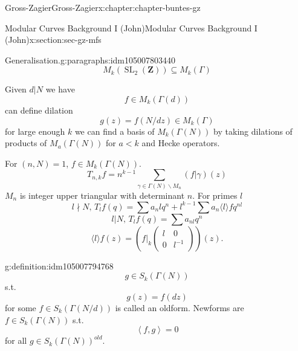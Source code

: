 \documentclass[oneside,10pt,]{book}
\numberwithin{equation}{section}
\newcommand{\inv}{^{-1}}
\newcommand{\pair}[2]{\left\langle #1, #2 \right\rangle}
\newcommand{\ZZ}{\mathbf{Z}}
\DeclareMathOperator{\SL}{SL}
\newcommand{\lt}{<}
\newcommand{\amp}{&}
\begin{document}
\begin{chapterptx}{Gross-Zagier}{}{Gross-Zagier}{}{}{x:chapter:chapter-buntes-gz}
\begin{sectionptx}{Modular Curves Background I (John)}{}{Modular Curves Background I (John)}{}{}{x:section:sec-gz-mfs}
\begin{paragraphs}{Generalisation.}{g:paragraphs:idm105007803440}
\begin{equation*}
\end{equation*}
%
\begin{equation*}
M_k(\SL_2(\ZZ)) \subseteq M_k(\Gamma )
\end{equation*}
%
\par
Given \(d|N\) we have%
\begin{equation*}
f \in M_k(\Gamma (d))
\end{equation*}
can define dilation%
\begin{equation*}
g(z) = f(N/d z) \in M_k(\Gamma )
\end{equation*}
for large enough \(k\) we can find a basis of \(M_k(\Gamma (N))\) by taking dilations of products of \(M_a(\Gamma (N))\) for \(a \lt k\) and Hecke operators.%
\par
For \((n,N) = 1\), \(f\in M_k(\Gamma (N))\).%
\begin{equation*}
T_{n,k} f = n^{k-1} \sum_{\gamma \in \Gamma (N) \backslash M_n} (f|\gamma )(z)
\end{equation*}
\(M_n\) is integer upper triangular with determinant \(n\). For primes \(l\)%
\begin{equation*}
l\nmid N,\, T_l f(q) = \sum a_n l q^n + l^{k-1} \sum a_n \langle l \rangle f q^{nl}
\end{equation*}
%
\begin{equation*}
l | N,\, T_lf(q) = \sum a_{nl} q^n
\end{equation*}
%
\begin{equation*}
\langle l \rangle f(z) = \left(f|_k \begin{pmatrix} l \amp 0 \\ 0 \amp l\inv \end{pmatrix}\right) (z)\text{.}
\end{equation*}
%
\begin{definition}{}{g:definition:idm105007794768}%
%
\begin{equation*}
g \in S_k(\Gamma (N))
\end{equation*}
s.t.%
\begin{equation*}
g(z) = f(d z)
\end{equation*}
for some \(f \in S_k(\Gamma (N/d))\) is called an oldform. Newforms are \(f\in S_k(\Gamma (N))\) s.t.%
\begin{equation*}
\pair fg = 0
\end{equation*}
for all \(g\in S_k(\Gamma (N))^{old}\).%
\end{definition}
\end{paragraphs}%
\end{sectionptx}

\end{chapterptx}
\end{document}
